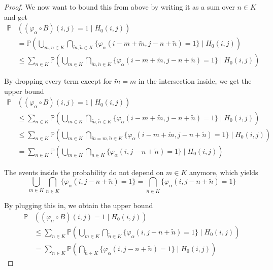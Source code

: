 \documentclass[a4paper,12pt]{article}
\theoremstyle{plain}
\theoremstyle{definition}
\theoremstyle{remark}
\begin{document}
\begin{proof}
	We now want to bound this from above by writing it as a sum over $n \in K$ and get
	\begin{align*}
		\mathbb{P}&( (\varphi_\alpha \circ B)(i, j) = 1 \mid H_0(i, j) ) \\
		&= \mathbb{P}\left( \bigcup_{m, n \in K} \bigcap_{\tilde{m}, \tilde{n} \in K} \{ \varphi_\alpha(i - m + \tilde{m}, j - n + \tilde{n}) = 1 \} \mid H_0(i, j) \right) \\
		&\leq \sum_{n \in K} \mathbb{P}\left( \bigcup_{m \in K} \bigcap_{\tilde{m}, \tilde{n} \in K} \{ \varphi_\alpha(i - m + \tilde{m}, j - n + \tilde{n}) = 1 \} \mid H_0(i, j) \right)
	\end{align*}
	
	By dropping every term except for $\tilde{m} = m$ in the intersection inside, we get the upper bound
	\begin{align*}
		\mathbb{P}&( (\varphi_\alpha \circ B)(i, j) = 1 \mid H_0(i, j) ) \\
		&\leq \sum_{n \in K} \mathbb{P}\left( \bigcup_{m \in K} \bigcap_{\tilde{m}, \tilde{n} \in K} \{ \varphi_\alpha(i - m + \tilde{m}, j - n + \tilde{n}) = 1 \} \mid H_0(i, j) \right) \\
		&\leq \sum_{n \in K} \mathbb{P}\left( \bigcup_{m \in K} \bigcap_{\tilde{m} = m, \tilde{n} \in K} \{ \varphi_\alpha(i - m + \tilde{m}, j - n + \tilde{n}) = 1 \} \mid H_0(i, j) \right) \\
		&= \sum_{n \in K} \mathbb{P}\left( \bigcup_{m \in K} \bigcap_{\tilde{n} \in K} \{ \varphi_\alpha(i, j - n + \tilde{n}) = 1 \} \mid H_0(i, j) \right)
	\end{align*}
	
	The events inside the probability do not depend on $m \in K$ anymore, which yields
	\begin{equation*}
		\bigcup_{m \in K} \bigcap_{\tilde{n} \in K} \{ \varphi_\alpha(i, j - n + \tilde{n}) = 1 \} = \bigcap_{\tilde{n} \in K} \{ \varphi_\alpha(i, j - n + \tilde{n}) = 1 \}
	\end{equation*}
	
	By plugging this in, we obtain the upper bound
	\begin{align*}
		\mathbb{P}&( (\varphi_\alpha \circ B)(i, j) = 1 \mid H_0(i, j) ) \\
		&\leq \sum_{n \in K} \mathbb{P}\left( \bigcup_{m \in K} \bigcap_{\tilde{n} \in K} \{ \varphi_\alpha(i, j - n + \tilde{n}) = 1 \} \mid H_0(i, j) \right) \\
		&= \sum_{n \in K} \mathbb{P}\left( \bigcap_{\tilde{n} \in K} \{ \varphi_\alpha(i, j - n + \tilde{n}) = 1 \} \mid H_0(i, j) \right)
	\end{align*}
	

\end{proof}
\end{document}
